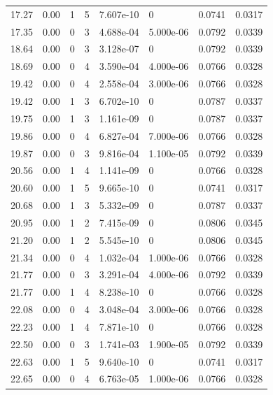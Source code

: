 \documentclass[preview]{standalone}
\begin{document}
{{{\begin{tabular}{L{1.2cm}C{1.2cm} C{0.3cm}C{0.5cm} C{1.4cm}C{1.4cm} C{1.4cm}C{1.4cm}}
  17.27  &  0.00  & 1     &  5 &  7.607e-10  & 0  & 0.0741 &  0.0317   \\ 
  17.35  &  0.00  & 0     &  3 &  4.688e-04  & 5.000e-06  & 0.0792 &  0.0339   \\ 
  18.64  &  0.00  & 0     &  3 &  3.128e-07  & 0  & 0.0792 &  0.0339   \\ 
  18.69  &  0.00  & 0     &  4 &  3.590e-04  & 4.000e-06  & 0.0766 &  0.0328   \\ 
  19.42  &  0.00  & 0     &  4 &  2.558e-04  & 3.000e-06  & 0.0766 &  0.0328   \\ 
  19.42  &  0.00  & 1     &  3 &  6.702e-10  & 0  & 0.0787 &  0.0337   \\ 
  19.75  &  0.00  & 1     &  3 &  1.161e-09  & 0  & 0.0787 &  0.0337   \\ 
  19.86  &  0.00  & 0     &  4 &  6.827e-04  & 7.000e-06  & 0.0766 &  0.0328   \\ 
  19.87  &  0.00  & 0     &  3 &  9.816e-04  & 1.100e-05  & 0.0792 &  0.0339   \\ 
  20.56  &  0.00  & 1     &  4 &  1.141e-09  & 0  & 0.0766 &  0.0328   \\ 
  20.60  &  0.00  & 1     &  5 &  9.665e-10  & 0  & 0.0741 &  0.0317   \\ 
  20.68  &  0.00  & 1     &  3 &  5.332e-09  & 0  & 0.0787 &  0.0337   \\ 
  20.95  &  0.00  & 1     &  2 &  7.415e-09  & 0  & 0.0806 &  0.0345   \\ 
  21.20  &  0.00  & 1     &  2 &  5.545e-10  & 0  & 0.0806 &  0.0345   \\ 
  21.34  &  0.00  & 0     &  4 &  1.032e-04  & 1.000e-06  & 0.0766 &  0.0328   \\ 
  21.77  &  0.00  & 0     &  3 &  3.291e-04  & 4.000e-06  & 0.0792 &  0.0339   \\ 
  21.77  &  0.00  & 1     &  4 &  8.238e-10  & 0  & 0.0766 &  0.0328   \\ 
  22.08  &  0.00  & 0     &  4 &  3.048e-04  & 3.000e-06  & 0.0766 &  0.0328   \\ 
  22.23  &  0.00  & 1     &  4 &  7.871e-10  & 0  & 0.0766 &  0.0328   \\ 
  22.50  &  0.00  & 0     &  3 &  1.741e-03  & 1.900e-05  & 0.0792 &  0.0339   \\ 
  22.63  &  0.00  & 1     &  5 &  9.640e-10  & 0  & 0.0741 &  0.0317   \\ 
  22.65  &  0.00  & 0     &  4 &  6.763e-05  & 1.000e-06  & 0.0766 &  0.0328   \\ 

\end{tabular}}}}
\end{document}
